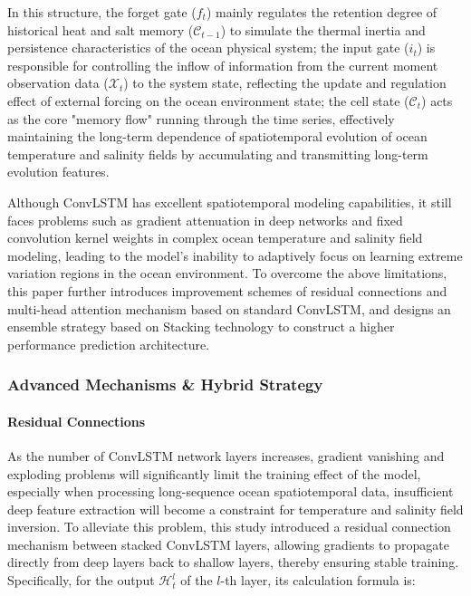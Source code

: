 \documentclass[webpdf,contemporary,large]{oup-authoring-template}
\begin{document}
In this structure, the forget gate ($f_t$) mainly regulates the retention degree of historical heat and salt memory ($\mathcal{C}_{t-1}$) to simulate the thermal inertia and persistence characteristics of the ocean physical system; the input gate ($i_t$) is responsible for controlling the inflow of information from the current moment observation data ($\mathcal{X}_t$) to the system state, reflecting the update and regulation effect of external forcing on the ocean environment state; the cell state ($\mathcal{C}_t$) acts as the core "memory flow" running through the time series, effectively maintaining the long-term dependence of spatiotemporal evolution of ocean temperature and salinity fields by accumulating and transmitting long-term evolution features.

Although ConvLSTM has excellent spatiotemporal modeling capabilities, it still faces problems such as gradient attenuation in deep networks and fixed convolution kernel weights in complex ocean temperature and salinity field modeling, leading to the model's inability to adaptively focus on learning extreme variation regions in the ocean environment. To overcome the above limitations, this paper further introduces improvement schemes of residual connections and multi-head attention mechanism based on standard ConvLSTM, and designs an ensemble strategy based on Stacking technology to construct a higher performance prediction architecture.

\subsubsection{Advanced Mechanisms \& Hybrid Strategy}

\paragraph{Residual Connections}

As the number of ConvLSTM network layers increases, gradient vanishing and exploding problems will significantly limit the training effect of the model, especially when processing long-sequence ocean spatiotemporal data, insufficient deep feature extraction will become a constraint for temperature and salinity field inversion. To alleviate this problem, this study introduced a residual connection mechanism between stacked ConvLSTM layers, allowing gradients to propagate directly from deep layers back to shallow layers, thereby ensuring stable training. Specifically, for the output $\mathcal{H}^l_t$ of the $l$-th layer, its calculation formula is:
\end{document}
